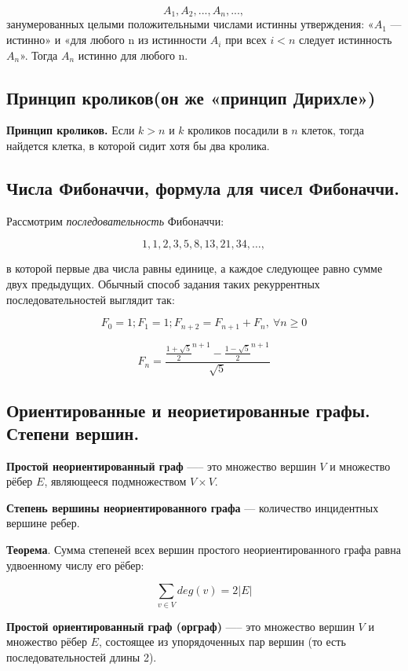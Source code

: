 \documentclass[a4paper, 10pt]{article}
\begin{document}
$$A_1, A_2, ..., A_n, ...,$$ занумерованных целыми положительными числами истинны утверждения: «$A_1$ --- истинно» и «для любого n из истинности $A_i$ при всех $i < n$ следует истинность $A_n$». Тогда $A_n$ истинно для любого n.


\subsection{Принцип кроликов(он же «принцип Дирихле»)}

\textbf{Принцип кроликов.} Если $k > n$ и $k$ кроликов посадили в $n$ клеток, тогда найдется клетка, в которой сидит хотя бы два кролика.

\subsection{Числа Фибоначчи, формула для чисел Фибоначчи.}


Рассмотрим \textit{последовательность} Фибоначчи:

$$1, 1, 2, 3, 5, 8, 13, 21, 34, \dots, $$

в которой первые два числа равны единице, а каждое следующее равно сумме двух предыдущих. Обычный способ задания таких рекуррентных последовательностей выглядит так: 

$$F_0 = 1; F_1 = 1; F_{n+2} = F_{n + 1} + F_n, \  \forall n \geqslant 0$$

$$F_n = \frac{\frac{1 + \sqrt{5}}{2}^{n + 1} - \frac{1 - \sqrt{5}}{2}^{n + 1}}{\sqrt{5}}$$



\subsection{Ориентированные и неориетированные графы. Степени вершин.}

\textbf{Простой неориентированный граф} —-- это множество вершин $V$ и множество рёбер $E$, являющееся подмножеством $V \times V$.

\textbf{Степень вершины неориентированного графа} --- количество инцидентных вершине ребер.

\textbf{Теорема}. Сумма степеней всех вершин простого неориентированного графа равна удвоенному числу его рёбер: 

$$\sum_{v \in V} deg(v) = 2|E|$$

\vspace{5mm}

\textbf{Простой ориентированный граф (орграф)} —-- это множество вершин $V$ и множество рёбер $E$, состоящее из упорядоченных пар вершин (то есть последовательностей длины 2).
\end{document}
